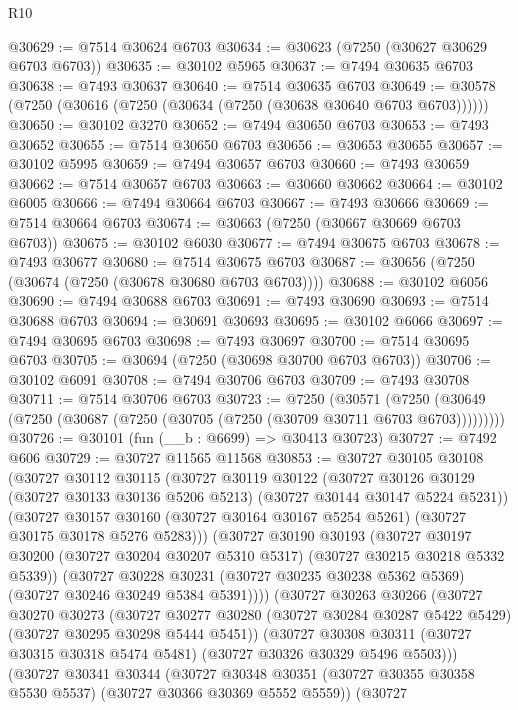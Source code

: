 \begin{lexlean}{R10}
\begin{coremodule}
@30629 := @7514 @30624 @6703
@30634 := @30623 (@7250 (@30627 @30629 @6703 @6703))
@30635 := @30102 @5965
@30637 := @7494 @30635 @6703
@30638 := @7493 @30637
@30640 := @7514 @30635 @6703
@30649 := @30578 (@7250 (@30616 (@7250 (@30634 (@7250 (@30638 @30640 @6703 @6703))))))
@30650 := @30102 @3270
@30652 := @7494 @30650 @6703
@30653 := @7493 @30652
@30655 := @7514 @30650 @6703
@30656 := @30653 @30655
@30657 := @30102 @5995
@30659 := @7494 @30657 @6703
@30660 := @7493 @30659
@30662 := @7514 @30657 @6703
@30663 := @30660 @30662
@30664 := @30102 @6005
@30666 := @7494 @30664 @6703
@30667 := @7493 @30666
@30669 := @7514 @30664 @6703
@30674 := @30663 (@7250 (@30667 @30669 @6703 @6703))
@30675 := @30102 @6030
@30677 := @7494 @30675 @6703
@30678 := @7493 @30677
@30680 := @7514 @30675 @6703
@30687 := @30656 (@7250 (@30674 (@7250 (@30678 @30680 @6703 @6703))))
@30688 := @30102 @6056
@30690 := @7494 @30688 @6703
@30691 := @7493 @30690
@30693 := @7514 @30688 @6703
@30694 := @30691 @30693
@30695 := @30102 @6066
@30697 := @7494 @30695 @6703
@30698 := @7493 @30697
@30700 := @7514 @30695 @6703
@30705 := @30694 (@7250 (@30698 @30700 @6703 @6703))
@30706 := @30102 @6091
@30708 := @7494 @30706 @6703
@30709 := @7493 @30708
@30711 := @7514 @30706 @6703
@30723 := @7250
    (@30571 (@7250 (@30649 (@7250 (@30687 (@7250 (@30705 (@7250 (@30709 @30711 @6703 @6703)))))))))
@30726 := @30101 (fun (__b : @6699) => @30413 @30723)
@30727 := @7492 @606
@30729 := @30727 @11565 @11568
@30853 := @30727
    @30105
    @30108
    (@30727
      @30112
      @30115
      (@30727
        @30119
        @30122
        (@30727 @30126 @30129 (@30727 @30133 @30136 @5206 @5213) (@30727 @30144 @30147 @5224 @5231))
        (@30727
          @30157
          @30160
          (@30727 @30164 @30167 @5254 @5261)
          (@30727 @30175 @30178 @5276 @5283)))
      (@30727
        @30190
        @30193
        (@30727 @30197 @30200 (@30727 @30204 @30207 @5310 @5317) (@30727 @30215 @30218 @5332 @5339))
        (@30727
          @30228
          @30231
          (@30727 @30235 @30238 @5362 @5369)
          (@30727 @30246 @30249 @5384 @5391))))
    (@30727
      @30263
      @30266
      (@30727
        @30270
        @30273
        (@30727 @30277 @30280 (@30727 @30284 @30287 @5422 @5429) (@30727 @30295 @30298 @5444 @5451))
        (@30727
          @30308
          @30311
          (@30727 @30315 @30318 @5474 @5481)
          (@30727 @30326 @30329 @5496 @5503)))
      (@30727
        @30341
        @30344
        (@30727 @30348 @30351 (@30727 @30355 @30358 @5530 @5537) (@30727 @30366 @30369 @5552 @5559))
        (@30727

\end{coremodule}
\end{lexlean}
